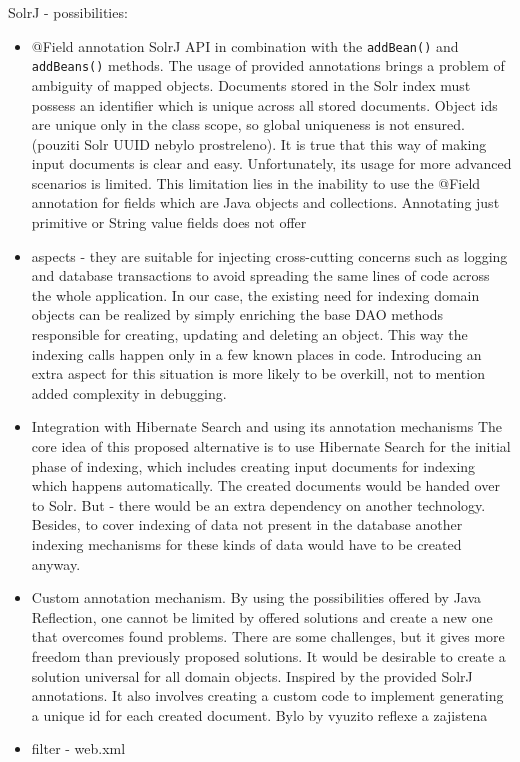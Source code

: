 \documentclass[12pt, oneside, a4paper]{book}
\begin{document}
SolrJ - possibilities:
\begin{itemize}
\item @Field annotation SolrJ API in combination with the \texttt{addBean()} and \texttt{addBeans()} methods.
The usage of provided annotations brings a problem of ambiguity of mapped objects. Documents stored in the Solr index must possess an identifier which is unique across all stored documents. Object ids are unique only in the class scope, so global uniqueness is not ensured. (pouziti Solr UUID nebylo
prostreleno). It is true that this way of making input documents is clear and easy. Unfortunately, its usage for more advanced scenarios is limited. This limitation lies in the inability to use the @Field annotation for fields which are Java objects and collections. Annotating just primitive or String value fields does not offer 

\item aspects - they are suitable for injecting cross-cutting concerns such as logging and database transactions to avoid spreading the same lines of code across the whole application. 
In our case, the existing need for indexing domain objects can be realized by simply enriching the base DAO methods responsible for creating, updating and deleting an object. This way the indexing calls happen only in a few known places in code. Introducing an extra aspect for this situation is more likely to be overkill, not to mention added complexity in debugging.

\item Integration with Hibernate Search and using its annotation mechanisms
The core idea of this proposed alternative is to use Hibernate Search for the initial phase of indexing, which includes creating input documents for indexing which happens automatically. The created documents would be handed over to Solr.
But - there would be an extra dependency on another technology. Besides, to cover indexing of data not present in the database another indexing mechanisms for these kinds of data would have to be created anyway. 

\item Custom annotation mechanism. By using the possibilities offered by Java Reflection, one cannot be limited by offered solutions and create a new one that overcomes found problems. There are some challenges, but it gives more freedom than previously proposed solutions. It would be desirable to create a solution universal for all domain objects. Inspired by the provided SolrJ annotations. It also involves creating a custom code to implement generating a unique id for each created document.  Bylo by vyuzito reflexe a zajistena

\item filter - web.xml
\end{itemize}
\end{document}
